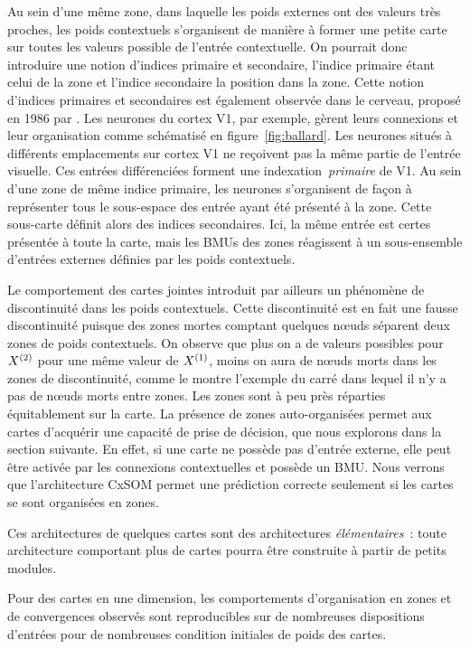\documentclass[../main]{subfiles}
\begin{document}
Au sein d'une même zone, dans laquelle les poids externes ont des valeurs très proches, les poids contextuels s'organisent de manière à former une petite carte sur toutes les valeurs possible de l'entrée contextuelle.
On pourrait donc introduire une notion d'indices primaire et secondaire, l'indice primaire étant celui de la zone et l'indice secondaire la position dans la zone.
Cette notion d'indices primaires et secondaires est également observée dans le cerveau, proposé en 1986 par \cite{ballard_cortical_1986}. Les neurones du cortex V1, par exemple, gèrent leurs connexions et leur organisation comme schématisé en figure~\ref{fig:ballard}.
Les neurones situés à différents emplacements sur cortex V1 ne reçoivent pas la même partie de l'entrée visuelle. Ces entrées différenciées forment une indexation~\emph{primaire} de V1. Au sein d'une zone de même indice primaire, les neurones s'organisent de façon à représenter tous le sous-espace des entrée ayant été présenté à la zone. Cette sous-carte définit alors des indices secondaires.
Ici, la même entrée est certes présentée à toute la carte, mais les BMUs des zones réagissent à un sous-ensemble d'entrées externes définies par les poids contextuels.

Le comportement des cartes jointes introduit par ailleurs un phénomène de discontinuité dans les poids contextuels. Cette discontinuité est en fait une fausse discontinuité puisque des zones mortes comptant quelques n\oe{}uds séparent deux zones de poids contextuels.
On observe que plus on a de valeurs possibles pour $X^{({2})}$ pour une même valeur de $X^{({1})}$, moins on aura de n\oe{}uds morts dans les zones de discontinuité, comme le montre l'exemple du carré dans lequel il n'y a pas de n\oe{}uds morts entre zones.
Les zones sont à peu près réparties équitablement sur la carte.
La présence de zones auto-organisées permet aux cartes d'acquérir une capacité de prise de décision, que nous explorons dans la section suivante.
En effet, si une carte ne possède pas d'entrée externe, elle peut être activée par les connexions contextuelles et possède un BMU. Nous verrons que l'architecture CxSOM permet une prédiction correcte seulement si les cartes se sont organisées en zones.

Ces architectures de quelques cartes sont des architectures \emph{élémentaires}~: toute architecture comportant plus de cartes pourra être construite à partir de petits modules.

Pour des cartes en une dimension, les comportements d'organisation en zones et de convergences observés sont reproducibles sur de nombreuses dispositions d'entrées pour de nombreuses condition initiales de poids des cartes.
\end{document}
